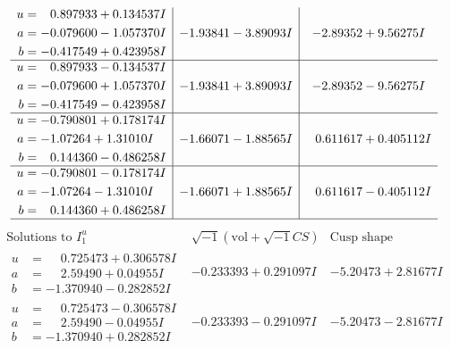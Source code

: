 \documentclass[1p]{elsarticle_modified}
\theoremstyle{definition}
\newcommand{\I}{\sqrt{-1}}
\begin{document}
$$\begin{array}{c|c|c}
\begin{aligned}
u &= \phantom{-}0.897933 + 0.134537 I \\
a &= -0.079600 - 1.057370 I \\
b &= -0.417549 + 0.423958 I\end{aligned}
 & -1.93841 - 3.89093 I & -2.89352 + 9.56275 I \\ \hline\begin{aligned}
u &= \phantom{-}0.897933 - 0.134537 I \\
a &= -0.079600 + 1.057370 I \\
b &= -0.417549 - 0.423958 I\end{aligned}
 & -1.93841 + 3.89093 I & -2.89352 - 9.56275 I \\ \hline\begin{aligned}
u &= -0.790801 + 0.178174 I \\
a &= -1.07264 + 1.31010 I \\
b &= \phantom{-}0.144360 - 0.486258 I\end{aligned}
 & -1.66071 - 1.88565 I & \phantom{-}0.611617 + 0.405112 I \\ \hline\begin{aligned}
u &= -0.790801 - 0.178174 I \\
a &= -1.07264 - 1.31010 I \\
b &= \phantom{-}0.144360 + 0.486258 I\end{aligned}
 & -1.66071 + 1.88565 I & \phantom{-}0.611617 - 0.405112 I\\
 \hline 
 \end{array}$$\newpage$$\begin{array}{c|c|c}  
\text{Solutions to }I^u_{1}& \I (\text{vol} + \sqrt{-1}CS) & \text{Cusp shape}\\
 \hline 
\begin{aligned}
u &= \phantom{-}0.725473 + 0.306578 I \\
a &= \phantom{-}2.59490 + 0.04955 I \\
b &= -1.370940 - 0.282852 I\end{aligned}
 & -0.233393 + 0.291097 I & -5.20473 + 2.81677 I \\ \hline\begin{aligned}
u &= \phantom{-}0.725473 - 0.306578 I \\
a &= \phantom{-}2.59490 - 0.04955 I \\
b &= -1.370940 + 0.282852 I\end{aligned}
 & -0.233393 - 0.291097 I & -5.20473 - 2.81677 I \\ \hline\begin{aligned}

\end{aligned}
\end{array}$$
\end{document}
